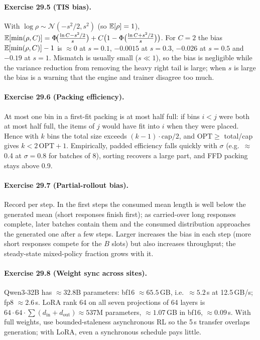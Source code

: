\paragraph{Exercise 29.5 (TIS bias).}
With $\log\rho\sim\mathcal{N}(-s^2/2,s^2)$ (so $\mathbb{E}[\rho]=1$),
$\mathbb{E}[\min(\rho,C)]=\Phi\!\big(\tfrac{\ln C-s^2/2}{s}\big)+C\big(1-\Phi\big(\tfrac{\ln C+s^2/2}{s}\big)\big)$.
For $C=2$ the bias $\mathbb{E}[\min(\rho,C)]-1$ is $\approx0$ at $s=0.1$, $-0.0015$ at $s=0.3$, $-0.026$ at
$s=0.5$ and $-0.19$ at $s=1$. Mismatch is usually small ($s\ll1$), so the bias is negligible while
the variance reduction from removing the heavy right tail is large; when $s$ is large the bias is a
warning that the engine and trainer disagree too much.

\paragraph{Exercise 29.6 (Packing efficiency).}
At most one bin in a first-fit packing is at most half full: if bins $i<j$ were both at most half
full, the items of $j$ would have fit into $i$ when they were placed. Hence with $k$ bins the total
size exceeds $(k-1)\cdot\text{cap}/2$, and $\mathrm{OPT}\ge$ total/cap gives $k<2\,\mathrm{OPT}+1$.
Empirically, padded efficiency falls quickly with $\sigma$ (e.g.\ $\approx$0.4 at $\sigma=0.8$ for
batches of 8), sorting recovers a large part, and FFD packing stays above 0.9.

\paragraph{Exercise 29.7 (Partial-rollout bias).}
Record  per step. In the first steps the consumed mean length is well
below the generated mean (short responses finish first); as carried-over long responses complete,
later batches contain them and the consumed distribution approaches the generated one after a few
steps. Larger  increases the bias in each step (more short responses compete for
the $B$ slots) but also increases throughput; the steady-state mixed-policy fraction grows with it.

\paragraph{Exercise 29.8 (Weight sync across sites).}
Qwen3-32B has $\approx32.8$B parameters: bf16 $\approx65.5$\,GB, i.e.\ $\approx5.2$\,s at
12.5\,GB/s; fp8 $\approx2.6$\,s. LoRA rank 64 on all seven projections of 64 layers is
$64\cdot64\cdot\sum(d_{\text{in}}+d_{\text{out}})\approx 537$M parameters, $\approx1.07$\,GB in bf16,
$\approx0.09$\,s. With full weights, use bounded-staleness asynchronous RL so the 5\,s transfer overlaps
generation; with LoRA, even a synchronous schedule pays little.

